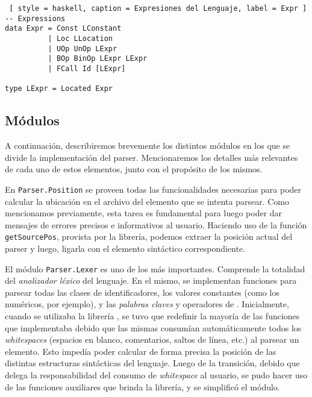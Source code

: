 
\begin{lstlisting} [ style = haskell, caption = Expresiones del Lenguaje, label = Expr ]
-- Expressions
data Expr = Const LConstant
          | Loc LLocation
          | UOp UnOp LExpr
          | BOp BinOp LExpr LExpr
          | FCall Id [LExpr]

type LExpr = Located Expr
\end{lstlisting}

\subsection{Módulos}

A continuación, describiremos brevemente los distintos módulos en los que se divide la implementación del parser.
Mencionaremos los detalles más relevantes de cada uno de estos elementos, junto con el propósito de los mismos.

En \lstinline[style = module]{Parser.Position} se proveen todas las funcionalidades necesarias para poder calcular la ubicación en el archivo del elemento que se intenta parsear.
Como mencionamos previamente, esta tarea es fundamental para luego poder dar mensajes de errores precisos e informativos al usuario.
Haciendo uso de la función \lstinline[style = haskell]{getSourcePos}, provista por la librería, podemos extraer la posición actual del parser y luego, ligarla con el elemento sintáctico correspondiente.

El módulo \lstinline[style = module]{Parser.Lexer} es uno de los más importantes. %
Comprende la totalidad del \textit{analizador léxico} del lenguaje.
En el mismo, se implementan funciones para parsear todas las clases de identificadores, los valores constantes (como los numéricos, por ejemplo), y las \textit{palabras claves} y operadores de \Lenguaje{}.
Inicialmente, cuando se utilizaba la librería \Parsec{}, se tuvo que redefinir la mayoría de las funciones que implementaba debido que las mismas consumían automáticamente todos los \textit{whitespaces} (espacios en blanco, comentarios, saltos de línea, etc.) al parsear un elemento.
Esto impedía poder calcular de forma precisa la posición de las distintas estructuras sintácticas del lenguaje.
Luego de la transición, debido que \Megaparsec{} delega la responsabilidad del consumo de \textit{whitespace} al usuario, se pudo hacer uso de las funciones auxiliares que brinda la librería, y se simplificó el módulo.

